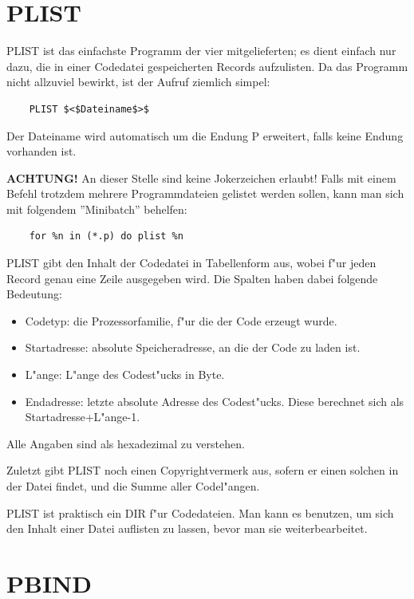 \documentclass[12pt,a4paper,twoside]{report}
\newcommand{\bb}[1]{{\bf #1}}
\begin{document}

\section{PLIST}

PLIST ist das einfachste Programm der vier mitgelieferten; es dient
einfach nur dazu, die in einer Codedatei gespeicherten Records aufzulisten.
Da das Programm nicht allzuviel bewirkt, ist der Aufruf ziemlich simpel:
\begin{verbatim}
    PLIST $<$Dateiname$>$
\end{verbatim}
Der Dateiname wird automatisch um die Endung P erweitert, falls keine
Endung vorhanden ist.
\par
\bb{ACHTUNG!}  An dieser Stelle sind keine Jokerzeichen erlaubt! Falls mit
einem Befehl trotzdem mehrere Programmdateien gelistet werden sollen,
kann man sich mit folgendem ''Minibatch'' behelfen:
\begin{verbatim}
    for %n in (*.p) do plist %n
\end{verbatim}
PLIST gibt den Inhalt der Codedatei in Tabellenform aus, wobei f"ur
jeden Record genau eine Zeile ausgegeben wird.  Die Spalten haben
dabei folgende Bedeutung:
\begin{itemize}
\item{Codetyp: die Prozessorfamilie, f"ur die der Code erzeugt wurde.}
\item{Startadresse: absolute Speicheradresse, an die der Code zu laden ist.}
\item{L"ange: L"ange des Codest"ucks in Byte.}
\item{Endadresse: letzte absolute Adresse des Codest"ucks.  Diese berechnet
      sich als Startadresse+L"ange-1.}
\end{itemize}
Alle Angaben sind als hexadezimal zu verstehen.
\par
Zuletzt gibt PLIST noch einen Copyrightvermerk aus, sofern er einen
solchen in der Datei findet, und die Summe aller Codel"angen.
\par
PLIST ist praktisch ein DIR f"ur Codedateien.  Man kann es benutzen,
um sich den Inhalt einer Datei auflisten zu lassen, bevor man sie
weiterbearbeitet.


\section{PBIND}
\end{document}
